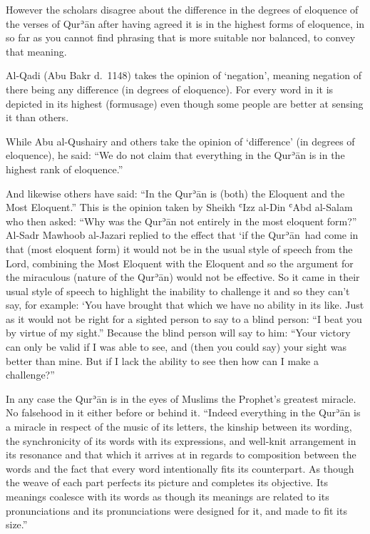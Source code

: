 \documentclass[12pt]{memoir}
\def\´{ʾ} %
\def\`{ʿ} %
\def \Quran{Qur\-\´ān} %
\let \Qrn=\Quran      %
\def\/{\discretionary{/}{}{/}}
\def\–{-\hskip0pt}
\begin{document}

However the scholars disagree about the difference in the degrees of eloquence
of the verses of \Qrn{} after having agreed it is in the highest forms of
eloquence, in so far as you cannot find phrasing that is more suitable nor
balanced, to convey that meaning.

Al\–Qadi (Abu Bakr d.\ 1148) takes the opinion of ‘negation’, meaning negation
of there being any difference (in degrees of eloquence). For every word in it
is depicted in its highest (form\/usage) even though some people are better at
sensing it than others.

While Abu al\–Qushairy and others take the opinion of ‘difference’ (in degrees
of eloquence), he said: “We do not claim that everything in the \Qrn{} is in
the highest rank of eloquence.”

And likewise others have said:
“In the \Qrn{} is (both) the Eloquent and the Most Eloquent.”
This is the opinion taken by Sheikh \`Izz al\–Din \`Abd al\–Salam
who then asked: “Why was the \Qrn{} not entirely in the most eloquent form?”
Al\–Sadr Mawhoob al\–Jazari replied to the effect that
‘if the \Quran\ had come in that (most eloquent form)
it would not be in the usual style of speech from the Lord,
combining the Most Eloquent with the Eloquent and so the argument
for the miraculous (nature of the \Quran) would not be effective.
So it came in their usual style of speech
to highlight the inability to challenge it and so they can’t say, for example:
‘You have brought that which we have no ability in its like. Just as it would
not be right for a sighted person to say to a blind person: “I beat you by
virtue of my sight.” Because the blind person will say to him: “Your victory
can only be valid if I was able to see, and (then you could say) your sight was
better than mine. But if I lack the ability to see then how can I make a
challenge?”\footnotemark


In any case the \Qrn{} is in the eyes of Muslims the Prophet’s greatest
miracle. No falsehood in it either before or behind it. “Indeed everything in
the \Qrn{} is a miracle in respect of the music of its letters, the kinship
between its wording, the synchronicity of its words with its expressions,
and well\–knit arrangement in its resonance and that which it arrives at in
regards to composition between the words and the fact that every word
intentionally fits its counterpart. As though the weave of each part perfects
its picture and completes its objective. Its meanings coalesce with its
words as though its meanings are related to its pronunciations and its
pronunciations were designed for it, and made to fit its size.”\footnotemark
\end{document}
